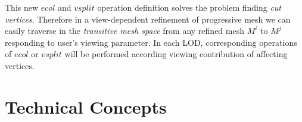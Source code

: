 This new $ecol$ and $vsplit$ operation definition solves the problem finding \emph{cut vertices}. Therefore in a view-dependent refinement of progressive mesh we can easily traverse in the \emph{transitive mesh space} from any refined mesh $M^i$ to $M^j$ responding to user's viewing parameter. In each LOD, corresponding operations of $ecol$ or $vsplit$ will be performed according viewing contribution of affecting vertices. 


\section{Technical Concepts}
\label{section:TechConcpt}




